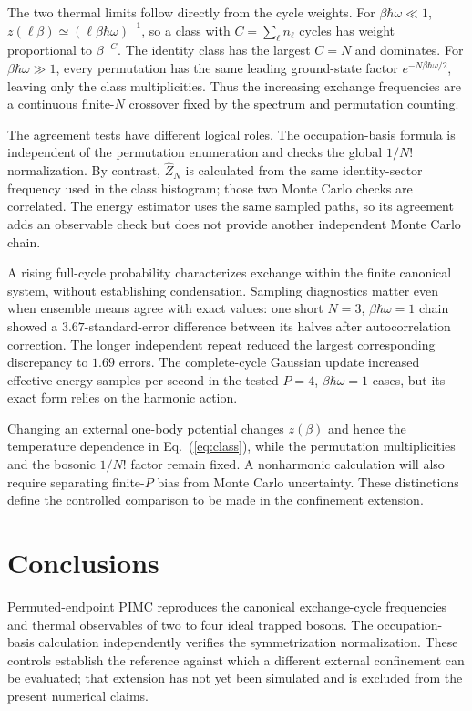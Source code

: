 \documentclass[aps,pra,reprint,floatfix,amsmath,amssymb,groupedaddress]{revtex4-2}
\begin{document}
The two thermal limits follow directly from the cycle weights. For $\beta\hbar\omega\ll1$, $z(\ell\beta)\simeq(\ell\beta\hbar\omega)^{-1}$, so a class with $C=\sum_\ell n_\ell$ cycles has weight proportional to $\beta^{-C}$. The identity class has the largest $C=N$ and dominates. For $\beta\hbar\omega\gg1$, every permutation has the same leading ground-state factor $e^{-N\beta\hbar\omega/2}$, leaving only the class multiplicities. Thus the increasing exchange frequencies are a continuous finite-$N$ crossover fixed by the spectrum and permutation counting.

The agreement tests have different logical roles. The occupation-basis formula is independent of the permutation enumeration and checks the global $1/N!$ normalization. By contrast, $\widehat Z_N$ is calculated from the same identity-sector frequency used in the class histogram; those two Monte Carlo checks are correlated. The energy estimator uses the same sampled paths, so its agreement adds an observable check but does not provide another independent Monte Carlo chain.

A rising full-cycle probability characterizes exchange within the finite canonical system, without establishing condensation. Sampling diagnostics matter even when ensemble means agree with exact values: one short $N=3$, $\beta\hbar\omega=1$ chain showed a $3.67$-standard-error difference between its halves after autocorrelation correction. The longer independent repeat reduced the largest corresponding discrepancy to $1.69$ errors. The complete-cycle Gaussian update increased effective energy samples per second in the tested $P=4$, $\beta\hbar\omega=1$ cases, but its exact form relies on the harmonic action.

\newpage
Changing an external one-body potential changes $z(\beta)$ and hence the temperature dependence in Eq.~(\ref{eq:class}), while the permutation multiplicities and the bosonic $1/N!$ factor remain fixed. A nonharmonic calculation will also require separating finite-$P$ bias from Monte Carlo uncertainty. These distinctions define the controlled comparison to be made in the confinement extension.

\section{Conclusions}

Permuted-endpoint PIMC reproduces the canonical exchange-cycle frequencies and thermal observables of two to four ideal trapped bosons. The occupation-basis calculation independently verifies the symmetrization normalization. These controls establish the reference against which a different external confinement can be evaluated; that extension has not yet been simulated and is excluded from the present numerical claims.
\end{document}
